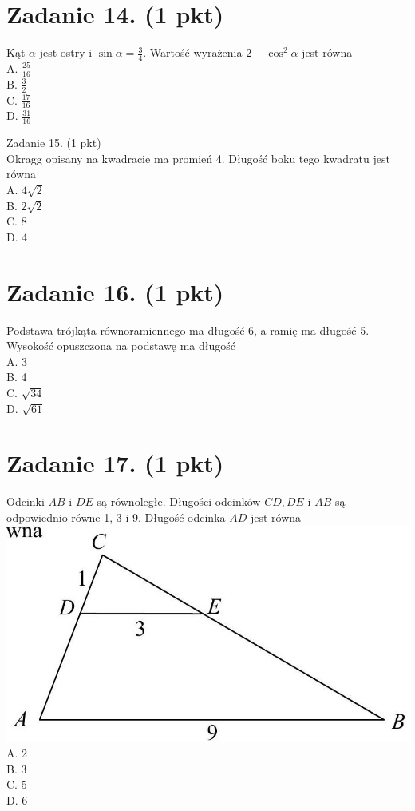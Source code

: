 \documentclass[10pt]{article}
\begin{document}
\section*{Zadanie 14. (1 pkt)}
Kąt \(\alpha\) jest ostry i \(\sin \alpha=\frac{3}{4}\). Wartość wyrażenia \(2-\cos ^{2} \alpha\) jest równa\\
A. \(\frac{25}{16}\)\\
B. \(\frac{3}{2}\)\\
C. \(\frac{17}{16}\)\\
D. \(\frac{31}{16}\)

Zadanie 15. (1 pkt)\\
Okragg opisany na kwadracie ma promień 4. Długość boku tego kwadratu jest równa\\
A. \(4 \sqrt{2}\)\\
B. \(2 \sqrt{2}\)\\
C. 8\\
D. 4

\section*{Zadanie 16. (1 pkt)}
Podstawa trójkąta równoramiennego ma długość 6, a ramię ma długość 5. Wysokość opuszczona na podstawę ma długość\\
A. 3\\
B. 4\\
C. \(\sqrt{34}\)\\
D. \(\sqrt{61}\)

\section*{Zadanie 17. (1 pkt)}
Odcinki \(A B\) i \(D E\) są równoległe. Długości odcinków \(C D, D E\) i \(A B\) są odpowiednio równe 1, 3 i 9. Długość odcinka \(A D\) jest równa\\
\includegraphics[max width=\textwidth, center]{2024_11_21_caf6b2e64dd65c9b24eeg-06(1)}\\
A. 2\\
B. 3\\
C. 5\\
D. 6
\end{document}
